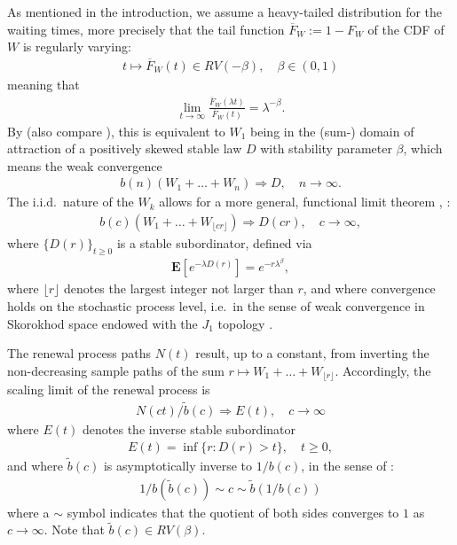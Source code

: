 \documentclass[12pt]{article}
\theoremstyle{definition}
\theoremstyle{remark}
\numberwithin{equation}{section}
\newcommand{\ex}{\mathbf {E}}
\newcommand{\1}{\mathbf 1}
\begin{document}
As mentioned in the introduction, we assume a heavy-tailed distribution 
for the waiting times, more precisely that the tail function 
$\overline F_W := 1 - F_W$ of the CDF of $W$ is regularly varying:
\begin{align}
t \mapsto \overline F_W(t) \in RV(-\beta), \quad \beta \in (0,1)
\end{align}
meaning that \cite{seneta,thebook}
\begin{align*}
\lim_{t \to \infty}\frac{\overline F_W(\lambda t)}{\overline F_W(t)}
= \lambda^{-\beta}.
\end{align*}
By \cite[Cor.~8.2.19]{thebook} (also compare \cite[Th.~4.5.1]{Whitt2010}), this is equivalent to $W_1$ being in the 
(sum-) domain of attraction of a positively skewed stable law $D$ with 
stability parameter $\beta$, which means the weak convergence
\begin{align}
b(n)(W_1 + \ldots + W_n) \Rightarrow D, \quad n \to \infty.
\end{align}
The i.i.d.\ nature of the $W_k$ allows for a more general, functional limit
theorem \cite[Ex.~11.2.18]{thebook}, \cite[Th.~4.5.3]{Whitt2010}:
\begin{align}
b(c)(W_1 + \ldots + W_{\lfloor cr \rfloor}) \Rightarrow D(cr), 
\quad c \to \infty,
\end{align}
where $\{D(r)\}_{t \ge 0}$ is a stable subordinator, defined via 
\begin{align}
\ex[e^{-\lambda D(r)}] = e^{-r \lambda^\beta},
\end{align}
where $\lfloor r \rfloor$ denotes the largest integer not larger than $r$,
and where convergence holds on the stochastic process level, i.e.\ in the sense
of weak convergence in Skorokhod space endowed with the $J_1$ topology
\cite[Sec.~3.3]{Whitt2010}. 

The renewal process paths $N(t)$ result, up to a constant, from
inverting the non-decreasing sample paths of the sum
$r \mapsto W_1 + \ldots + W_{\lfloor r \rfloor}$.
Accordingly, the scaling limit of the renewal process is \cite{limitCTRW} 
\begin{align}
N(ct) / \tilde b(c) \Rightarrow E(t), \quad c \to \infty
\end{align}
where $E(t)$ denotes the inverse stable subordinator \cite{invSubord}
\begin{align}
E(t) = \inf\{r: D(r) > t\}, \quad t \ge 0,
\end{align}
and where $\tilde b(c)$ is asymptotically inverse to $1/b(c)$, in the sense
of \cite[p.20]{seneta}: 
\begin{align}
1/b(\tilde b(c)) \sim c \sim \tilde b(1/b(c))
\end{align}
where a $\sim$ symbol indicates that the quotient of both sides converges to
$1$ as $c \to \infty$. 
Note that $\tilde b(c) \in RV(\beta)$. 
\end{document}
